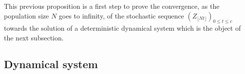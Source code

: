 \documentclass[11pt]{article}
\newtheorem{proposition}[theorem]{Proposition}
\theoremstyle{remark}
\numberwithin{equation}{section}
\begin{document}


   

This previous proposition is a first step to prove the convergence, as the population size $N$ goes to infinity, of the stochastic sequence $(Z_{\lfloor Nt\rfloor})_{0\leq t\leq c}$ towards the solution of a deterministic dynamical system which is the object of the next subsection. 


\subsection{Dynamical system}
\end{document}
